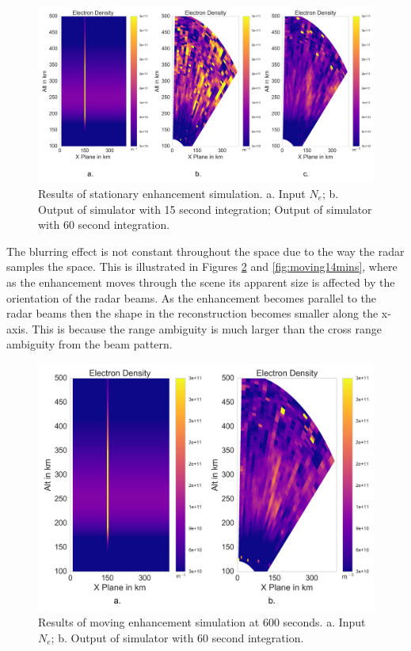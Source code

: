\documentclass[draft,ras]{agutex}
\begin{document}
\begin{article}
\begin{figure}[!t]
\centering
\includegraphics[width=5in]{stationary}
\caption{Results of stationary enhancement simulation. a. Input $N_e$; b. Output of simulator with 15 second integration;  Output of simulator with 60 second integration.}
\label{fig:stationaryall}
\end{figure}

The blurring effect is not constant throughout the space due to the way the radar samples the space. This is illustrated in Figures \ref{fig:moving10mins} and \ref{fig:moving14mins}, where as the enhancement moves through the scene its apparent size is affected by the orientation of the radar beams. As the enhancement becomes parallel to the radar beams then the shape in the reconstruction becomes smaller along the x-axis. This is because the range ambiguity is much larger than the cross range ambiguity from the beam pattern.

\begin{figure}[!t]
\centering
\includegraphics[width=5in]{moving6mins}
\caption{Results of moving enhancement simulation at 600 seconds. a. Input $N_e$; b. Output of simulator with 60 second integration.}
\label{fig:moving10mins}
\end{figure}



\end{article}
\end{document}

